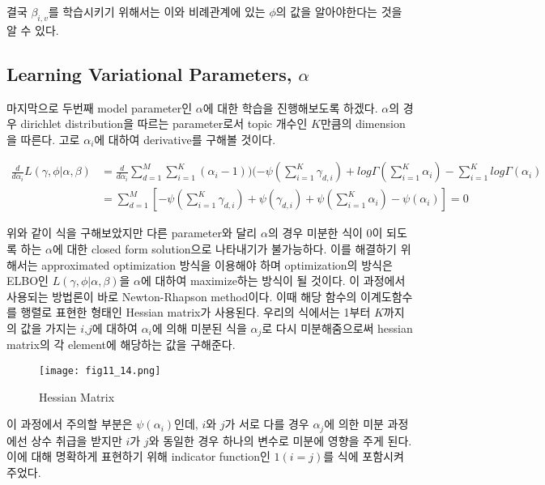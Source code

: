 \documentclass[draft=false]{oblivoir}
\begin{document}
결국 $\beta_{i,v}$를 학습시키기 위해서는 이와 비례관계에 있는 $\phi$의 값을 알아야한다는 것을 알 수 있다.

\subsection{Learning Variational Parameters, \texorpdfstring{$\alpha$}{Lg}}
마지막으로 두번째 model parameter인 $\alpha$에 대한 학습을 진행해보도록 하겠다. $\alpha$의 경우 dirichlet distribution을 따르는 parameter로서 topic 개수인 $K$만큼의 dimension을 따른다. 고로 $\alpha_{i}$에 대하여 derivative를 구해볼 것이다.

\begin{align}
\frac{d}{d\alpha_{i}}L(\gamma,\phi|\alpha,\beta)\nonumber & =
\frac{d}{d\alpha_{i}}\sum^{M}_{d=1}\sum^{K}_{i=1}(\alpha_{i}-1))(-\psi(\sum^{K}_{i=1}\gamma_{d,i})+log\Gamma(\sum^{K}_{i=1}\alpha_{i})-\sum^{K}_{i=1}log\Gamma(\alpha_{i})\nonumber\\
& = \sum^{M}_{d=1}[-\psi(\sum^{K}_{i=1}\gamma_{d,i})+\psi(\gamma_{d,i})+\psi(\sum^{K}_{i=1}\alpha_{i})-\psi(\alpha_{i})] = 0 
\end{align}

위와 같이 식을 구해보았지만 다른 parameter와 달리 $\alpha$의 경우 미분한 식이 0이 되도록 하는 $\alpha$에 대한 closed form solution으로 나타내기가 불가능하다. 이를 해결하기 위해서는 approximated optimization 방식을 이용해야 하며 optimization의 방식은 ELBO인 $L(\gamma,\phi|\alpha,\beta)$을 $\alpha$에 대하여 maximize하는 방식이 될 것이다. 이 과정에서 사용되는 방법론이 바로 Newton-Rhapson method이다. 이때 해당 함수의 이계도함수를 행렬로 표현한 형태인 Hessian matrix가 사용된다. 우리의 식에서는 1부터 $K$까지의 값을 가지는 $i$,$j$에 대하여 $\alpha_{i}$에 의해 미분된 식을 $\alpha_{j}$로 다시 미분해줌으로써 hessian matrix의 각 element에 해당하는 값을 구해준다. 

\begin{figure}[ht] \centering 
\texttt{[image: fig11\_14.png]} 
\caption{Hessian Matrix}
\label{fig:11-13}
\end{figure}

이 과정에서 주의할 부분은 $\psi(\alpha_{i})$인데, $i$와 $j$가 서로 다를 경우 $\alpha_{j}$에 의한 미분 과정에선 상수 취급을 받지만 $i$가 $j$와 동일한 경우 하나의 변수로 미분에 영향을 주게 된다. 이에 대해 명확하게 표현하기 위해 indicator function인 $1(i=j)$를 식에 포함시켜 주었다. 
\end{document}
